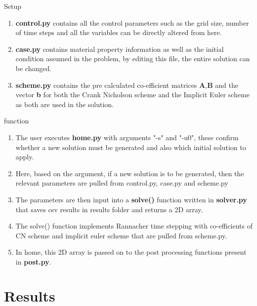 \documentclass[10pt,compress]{beamer}
\begin{document}
\begin{frame}{Setup}
\begin{enumerate}
	\item \textbf{control.py} contains all the control parameters such as the grid size, number of time steps and all the variables can be directly altered from here.
	\item \textbf{case.py} contains material property  information as well as the initial condition assumed in the problem, by editing this file, the entire solution can be changed.
	\item \textbf{scheme.py} contains the pre calculated co-efficient matrices \textbf{A},\textbf{B} and the vector \textbf{b} for both the Crank Nicholson scheme and the Implicit Euler scheme as both are used in the solution. 
\end{enumerate}
\end{frame}

\begin{frame}{function}
\begin{enumerate}
\item The user executes \textbf{home.py} with arguments "-s" and "-u0", these confirm whether a new solution must be generated and also which initial solution to apply. 
\item Here, based on the argument, if a new solution is to be generated, then the relevant parameters are pulled from control.py, case.py and scheme.py
\item The parameters are then input into a \textbf{solve()} function written in \textbf{solver.py} that saves csv results in results folder and returns a 2D array.
\item The solve() function implements Rannacher time stepping with co-efficients of CN scheme and implicit euler scheme that are pulled from scheme.py.
\item In home, this 2D array is passed on to the post processing functions present in \textbf{post.py}.
\end{enumerate}
\end{frame}

\section{Results}
\end{document}
